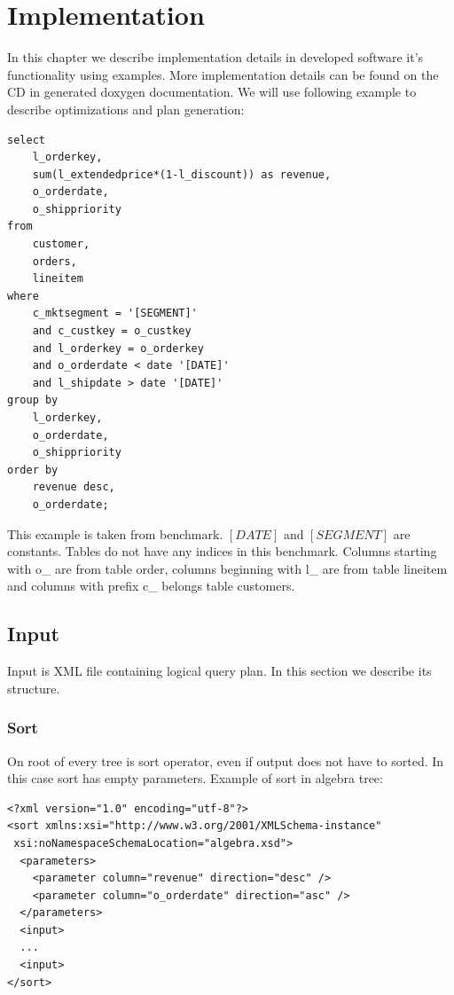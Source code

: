 \chapter{Implementation}
\label{implementation}
In this chapter we describe implementation details in developed software it's functionality using examples. More implementation details can be found on the CD in generated doxygen\cite{doxygen} documentation. We will use following example to describe optimizations and plan generation:


\begin{verbatim}
select
    l_orderkey,
    sum(l_extendedprice*(1-l_discount)) as revenue,
    o_orderdate,
    o_shippriority
from
    customer,
    orders,
    lineitem
where
    c_mktsegment = '[SEGMENT]'
    and c_custkey = o_custkey
    and l_orderkey = o_orderkey
    and o_orderdate < date '[DATE]'
    and l_shipdate > date '[DATE]'
group by
    l_orderkey,
    o_orderdate,
    o_shippriority
order by
    revenue desc,
    o_orderdate;
\end{verbatim}

This example is taken from benchmark\cite{benchmark}. $[DATE]$ and $[SEGMENT]$ are constants. Tables do not have any indices in this benchmark. Columns starting with o\_ are from table order, columns beginning with l\_ are from table lineitem and columns with prefix c\_ belongs table customers.



\section{Input}

Input is XML file containing logical query plan. In this section we describe its structure. 

\subsection{Sort}

On root of every tree is sort operator, even if output does not have to sorted. In this case sort has empty parameters. Example of sort in algebra tree:


\begin{lstlisting}
<?xml version="1.0" encoding="utf-8"?>
<sort xmlns:xsi="http://www.w3.org/2001/XMLSchema-instance"
 xsi:noNamespaceSchemaLocation="algebra.xsd">
  <parameters>
    <parameter column="revenue" direction="desc" />
    <parameter column="o_orderdate" direction="asc" />
  </parameters>
  <input>
  ...
  <input>
</sort>
\end{lstlisting}

